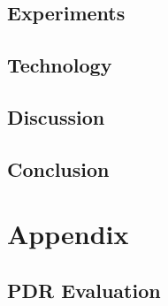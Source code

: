 \chapter{Experiments}










\chapter{Technology}




\chapter{Discussion}


\chapter{Conclusion}

\newpage
\listoftodos
\newpage



\printbibliography

\part{Appendix}
\appendix
\chapter{PDR Evaluation}\label{PDR:results}




